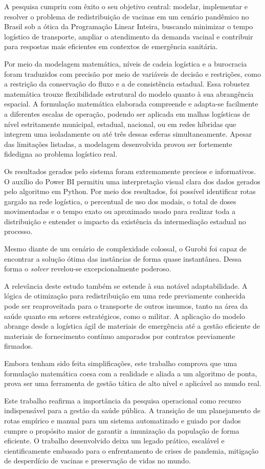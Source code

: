 A pesquisa cumpriu com êxito o seu objetivo central: modelar, implementar e resolver o problema de redistribuição de vacinas em um cenário pandêmico no Brasil sob a ótica da Programação Linear Inteira, buscando minimizar o tempo logístico de transporte, ampliar o atendimento da demanda vacinal e contribuir para respostas mais eficientes em contextos de emergência sanitária.

Por meio da modelagem matemática, níveis de cadeia logística e a burocracia foram traduzidos com precisão por meio de variáveis de decisão e restrições, como a restrição da conservação do fluxo e a de consistência estadual. Essa robustez matemática trouxe flexibilidade estrutural do modelo quanto à sua abrangência espacial. A formulação matemática elaborada compreende e adapta-se facilmente a diferentes escalas de operação, podendo ser aplicada em malhas logísticas de nível estritamente municipal, estadual, nacional, ou em redes híbridas que integrem uma isoladamente ou até três dessas esferas simultaneamente. Apesar das limitações listadas, a modelagem desenvolvida provou ser fortemente fidedigna ao problema logístico real.

Os resultados gerados pelo sistema foram extremamente precisos e informativos. O auxílio do Power BI permitiu uma interpretação visual clara dos dados gerados pelo algoritmo em Python. Por meio dos resultados, foi possível identificar rotas gargalo na rede logística, o percentual de uso dos modais, o total de doses movimentadas e o tempo exato ou aproximado usado para realizar toda a distribuição e entender o impacto da existência da intermediação estadual no processo.

Mesmo diante de um cenário de complexidade colossal, o Gurobi foi capaz de encontrar a solução ótima das instâncias de forma quase instantânea. Dessa forma o \textit{solver} revelou-se excepcionalmente poderoso.

A relevância deste estudo também se estende à sua notável adaptabilidade. A lógica de otimização para redistribuição em uma rede previamente conhecida pode ser reaproveitada para o transporte de outros insumos, tanto na área da saúde quanto em setores estratégicos, como o militar. A aplicação do modelo abrange desde a logística ágil de materiais de emergência até a gestão eficiente de materiais de fornecimento contínuo amparados por contratos previamente firmados.

Embora tenham sido feita simplificações, este trabalho comprova que uma formulação matemática coesa com a realidade e aliada a um algoritmo de ponta, prova ser uma ferramenta de gestão tática de alto nível e aplicável ao mundo real.

Este trabalho reafirma a importância da pesquisa operacional como recurso indispensável para a gestão da saúde pública. A transição de um planejamento de rotas empírico e manual para um sistema automatizado e guiado por dados cumpre o propósito maior de garantir a imunização da população de forma eficiente. O trabalho desenvolvido deixa um legado prático, escalável e cientificamente embasado para o enfrentamento de crises de pandemia, mitigação de desperdício de vacinas e preservação de vidas no mundo.
\bigskip
